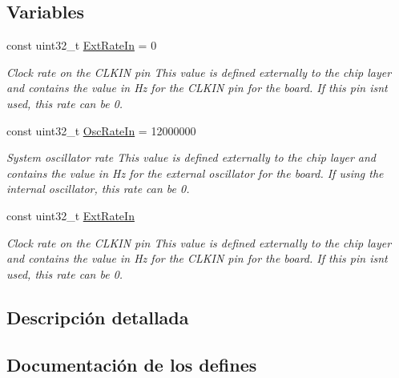 \subsection*{Variables}
\begin{DoxyCompactItemize}
\item 
const uint32\+\_\+t \hyperlink{group__hardware_ga74ceed751e84a920be263a7fe3da67f0}{Ext\+Rate\+In} = 0
\begin{DoxyCompactList}\small\item\em Clock rate on the C\+L\+K\+IN pin This value is defined externally to the chip layer and contains the value in Hz for the C\+L\+K\+IN pin for the board. If this pin isn\textquotesingle{}t used, this rate can be 0. \end{DoxyCompactList}\item 
const uint32\+\_\+t \hyperlink{group__hardware_ga2e84f0502f9a7fdd271b97c588696e6f}{Osc\+Rate\+In} = 12000000
\begin{DoxyCompactList}\small\item\em System oscillator rate This value is defined externally to the chip layer and contains the value in Hz for the external oscillator for the board. If using the internal oscillator, this rate can be 0. \end{DoxyCompactList}\end{DoxyCompactItemize}
\begin{DoxyCompactItemize}
\item 
const uint32\+\_\+t \hyperlink{group__hardware_ga74ceed751e84a920be263a7fe3da67f0}{Ext\+Rate\+In}
\begin{DoxyCompactList}\small\item\em Clock rate on the C\+L\+K\+IN pin This value is defined externally to the chip layer and contains the value in Hz for the C\+L\+K\+IN pin for the board. If this pin isn\textquotesingle{}t used, this rate can be 0. \end{DoxyCompactList}\end{DoxyCompactItemize}


\subsection{Descripción detallada}


\subsection{Documentación de los \textquotesingle{}defines\textquotesingle{}}
